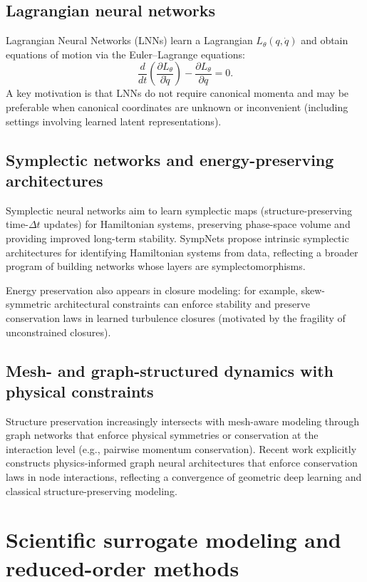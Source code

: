 \documentclass[11pt]{article}
\begin{document}
\subsection{Lagrangian neural networks}

Lagrangian Neural Networks (LNNs) learn a Lagrangian $L_\theta(q,\dot q)$ and obtain equations of motion via the Euler--Lagrange equations:
\begin{equation}
\frac{d}{dt}\left(\frac{\partial L_\theta}{\partial \dot q}\right)-\frac{\partial L_\theta}{\partial q}=0.
\end{equation}
A key motivation is that LNNs do not require canonical momenta and may be preferable when canonical coordinates are unknown or inconvenient (including settings involving learned latent representations).

\subsection{Symplectic networks and energy-preserving architectures}

Symplectic neural networks aim to learn symplectic maps (structure-preserving time-$\Delta t$ updates) for Hamiltonian systems, preserving phase-space volume and providing improved long-term stability. SympNets propose intrinsic symplectic architectures for identifying Hamiltonian systems from data, reflecting a broader program of building networks whose layers are symplectomorphisms.

Energy preservation also appears in closure modeling: for example, skew-symmetric architectural constraints can enforce stability and preserve conservation laws in learned turbulence closures (motivated by the fragility of unconstrained closures).

\subsection{Mesh- and graph-structured dynamics with physical constraints}

Structure preservation increasingly intersects with mesh-aware modeling through graph networks that enforce physical symmetries or conservation at the interaction level (e.g., pairwise momentum conservation). Recent work explicitly constructs physics-informed graph neural architectures that enforce conservation laws in node interactions, reflecting a convergence of geometric deep learning and classical structure-preserving modeling.

\section{Scientific surrogate modeling and reduced-order methods}
\end{document}
